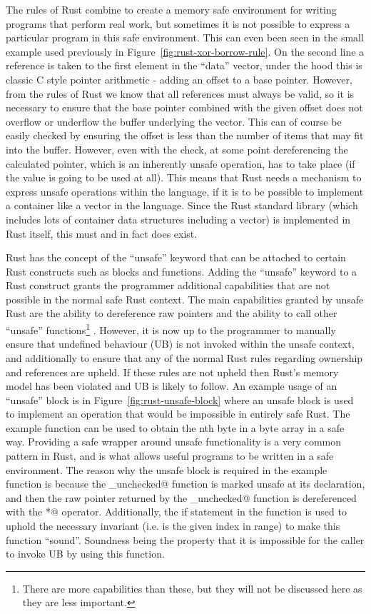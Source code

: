 
The rules of Rust combine to create a memory safe environment for writing
programs that perform real work, but sometimes it is not possible to express a
particular program in this safe environment. This can even been seen in the
small example used previously in Figure~\ref{fig:rust-xor-borrow-rule}. On the
second line a reference is taken to the first element in the ``data'' vector,
under the hood this is classic C style pointer arithmetic - adding an offset to
a base pointer. However, from the rules of Rust we know that all references
must always be valid, so it is necessary to ensure that the base pointer
combined with the given offset does not overflow or underflow the buffer
underlying the vector. This can of course be easily checked by ensuring the
offset is less than the number of items that may fit into the buffer. However,
even with the check, at some point dereferencing the calculated pointer, which
is an inherently unsafe operation, has to take place (if the value is going to
be used at all). This means that Rust needs a mechanism to express unsafe
operations within the language, if it is to be possible to implement a
container like a vector in the language. Since the Rust standard library (which
includes lots of container data structures including a vector) is implemented
in Rust itself, this must and in fact does exist.

Rust has the concept of the ``unsafe'' keyword that can be attached to certain
Rust constructs such as blocks and functions. Adding the ``unsafe'' keyword to
a Rust construct grants the programmer additional capabilities that are not
possible in the normal safe Rust context. The main capabilities granted by
unsafe Rust are the ability to dereference raw pointers and the ability to call
other ``unsafe'' functions\footnote{There are more capabilities than these,
but they will not be discussed here as they are less
important.} \cite{rust-nomicon}. However, it is now up to the programmer to
manually ensure that undefined behaviour (UB) is not invoked within the unsafe
context, and additionally to ensure that any of the normal Rust rules regarding
ownership and references are upheld. If these rules are not upheld then Rust's
memory model has been violated and UB is likely to follow. An example usage of
an ``unsafe'' block is in Figure~\ref{fig:rust-unsafe-block} where an unsafe
block is used to implement an operation that would be impossible in entirely
safe Rust. The example function can be used to obtain the nth byte in a byte
array in a safe way. Providing a safe wrapper around unsafe functionality is a
very common pattern in Rust, and is what allows useful programs to be written
in a safe environment. The reason why the unsafe block is required in the
example function is because the \verb@get_unchecked@ function is marked unsafe
at its declaration, and then the raw pointer returned by the
\verb@get_unchecked@ function is dereferenced with the \verb@*@ operator.
Additionally, the if statement in the function is used to uphold the necessary
invariant (i.e. is the given index in range) to make this function ``sound''.
Soundness being the property that it is impossible for the caller to invoke UB
by using this function.

